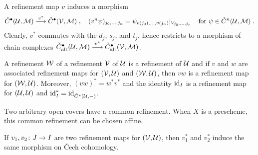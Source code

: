 \documentclass[a4paper,parskip=half,numbers=enddot, DIV=12]{scrreprt}
\newcommand{\vC}{\v{C}}
\begin{document}
A refinement map $v$ induces a morphism
\begin{align*}
	\check{C}^\bullet (\Uu,\Mm)\morphism[v^*]\check{C}^\bullet (\Vv,\Mm)\;,\quad(v^n\psi)_{j_0,\ldots,j_n}=\psi_{v(j_0),\ldots,v(j_n)}|_{V_{j_0,\ldots,j_n}}\quad\text{for }\psi\in\check{C}^n(\Uu,\Mm)\;.
\end{align*}
Clearly, $v^*$ commutes with the $d_j$, $s_j$, and $t_j$, hence restricts to a morphism of chain complexes $\check{C}_\alt^\bullet (\Uu,\Mm)\morphism[v^*]\check{C}_\alt^\bullet (\Vv,\Mm)$.
\begin{lem}
	\begin{alphanumerate}
		\item {}A refinement $\mathcal{W}$ of a refinement $\mathcal{V}$ of $\mathcal{U}$ is a refinement of $\mathcal{U}$ and if $v$ and $w$ are associated refinement maps for $(\mathcal{V},\mathcal{U})$ and $(\mathcal{W},\mathcal{U})$, then $vw$ is a refinement map for $(\mathcal{W},\mathcal{U})$. Moreover, $(vw)^*=w^*v^*$ and the identity $\operatorname{id}_I$ is a refinement map for $(\mathcal{U},\mathcal{U})$ and $\operatorname{id}_I^*=\operatorname{id}_{\check{C}^*(\mathcal{U},-)}$.
		\item Two arbitrary open covers have a common refinement. When $X$ is a prescheme, this common refinement can be chosen affine.
		\item If $v_1,v_2\colon J\morphism I$ are two refinement maps for $(\mathcal{V},\mathcal{U})$, then $v_1^*$ and $v_2^*$ induce the same morphism on \vC ech cohomology.
	\end{alphanumerate}
\end{lem}
\end{document}
